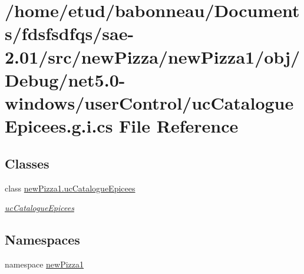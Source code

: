 \hypertarget{net5_80-windows_2userControl_2ucCatalogueEpicees_8g_8i_8cs}{}\section{/home/etud/babonneau/\+Documents/fdsfsdfqs/sae-\/2.01/src/new\+Pizza/new\+Pizza1/obj/\+Debug/net5.0-\/windows/user\+Control/uc\+Catalogue\+Epicees.g.\+i.\+cs File Reference}
\label{net5_80-windows_2userControl_2ucCatalogueEpicees_8g_8i_8cs}
\subsection*{Classes}
\begin{DoxyCompactItemize}
\item 
class \hyperlink{classnewPizza1_1_1ucCatalogueEpicees}{new\+Pizza1.\+uc\+Catalogue\+Epicees}
\begin{DoxyCompactList}\small\item\em \hyperlink{classnewPizza1_1_1ucCatalogueEpicees}{uc\+Catalogue\+Epicees} \end{DoxyCompactList}\end{DoxyCompactItemize}
\subsection*{Namespaces}
\begin{DoxyCompactItemize}
\item 
namespace \hyperlink{namespacenewPizza1}{new\+Pizza1}
\end{DoxyCompactItemize}
